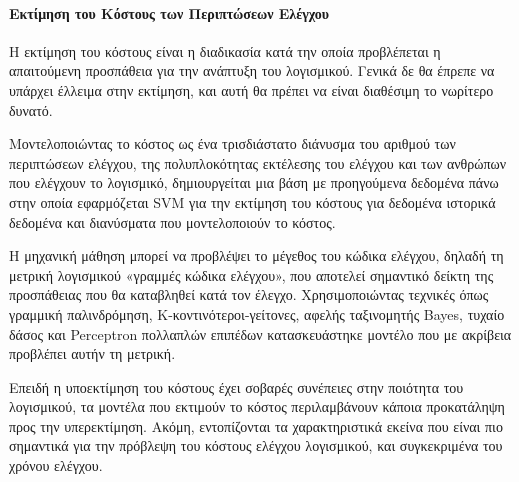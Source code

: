 \documentclass[12pt]{article}
\begin{document}
\paragraph{Εκτίμηση του Κόστους των Περιπτώσεων Ελέγχου}
Η εκτίμηση του κόστους είναι η διαδικασία κατά την οποία προβλέπεται η απαιτούμενη προσπάθεια για την ανάπτυξη του λογισμικού. Γενικά δε θα έπρεπε να υπάρχει έλλειμα στην εκτίμηση, και αυτή θα πρέπει να είναι διαθέσιμη το νωρίτερο δυνατό.
\par Μοντελοποιώντας το κόστος ως ένα τρισδιάστατο διάνυσμα του αριθμού των περιπτώσεων ελέγχου, της πολυπλοκότητας εκτέλεσης του ελέγχου και των ανθρώπων που ελέγχουν το λογισμικό, δημιουργείται μια βάση με προηγούμενα δεδομένα πάνω στην οποία εφαρμόζεται SVM για την εκτίμηση του κόστους για δεδομένα ιστορικά δεδομένα και διανύσματα που μοντελοποιούν το κόστος.
\par Η μηχανική μάθηση μπορεί να προβλέψει το μέγεθος του κώδικα ελέγχου, δηλαδή τη μετρική λογισμικού «γραμμές κώδικα ελέγχου», που αποτελεί σημαντικό δείκτη της προσπάθειας που θα καταβληθεί κατά τον έλεγχο. Χρησιμοποιώντας τεχνικές όπως γραμμική παλινδρόμηση, Κ-κοντινότεροι-γείτονες, αφελής ταξινομητής Bayes, τυχαίο δάσος και Perceptron πολλαπλών επιπέδων κατασκευάστηκε μοντέλο που με ακρίβεια προβλέπει αυτήν τη μετρική.
\par Επειδή η υποεκτίμηση του κόστους έχει σοβαρές συνέπειες στην ποιότητα του λογισμικού, τα μοντέλα που εκτιμούν το κόστος περιλαμβάνουν κάποια προκατάληψη προς την υπερεκτίμηση. Ακόμη, εντοπίζονται τα χαρακτηριστικά εκείνα που είναι πιο σημαντικά για την πρόβλεψη του κόστους ελέγχου λογισμικού, και συγκεκριμένα του χρόνου ελέγχου.
\end{document}
